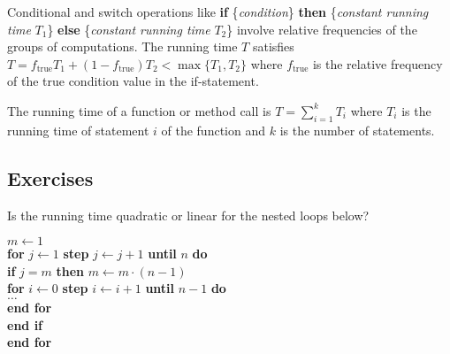 Conditional and switch operations like \textbf{if}
\{\emph{condition}\} \textbf{then} \{\emph{constant running time}
$T_1$\} \textbf{else} \{\emph{constant running time} $T_2$\} involve
relative frequencies of the groups of computations.  The running time
$T$ satisfies $T = f_\mathrm{true} T_1 + (1 - f_\mathrm{true}) T_2 <
\max \{ T_1, T_2 \}$ where $f_\mathrm{true}$ is the relative frequency
of the true condition value in the if-statement.

The running time of a function or method call is $T = \sum_{i=1}^{k}T_i$
where $T_i$ is the running time of statement \(i\) of the function
and $k$ is the number of statements.


\subsection*{Exercises}

\begin{Exercise}
\label{exm:nest1}
Is the running time quadratic or linear for the nested loops below?\\

\begin{minipage}{5in}
\Algorbody
{
\(m \leftarrow 1\) \\
\textbf{for} \(j \leftarrow 1\) \textbf{step} \(j \leftarrow j+1\) 
                                    \textbf{until} \(n\) \textbf{do}\\
\>\textbf{if} \(j = m \) \textbf{then} \(m \leftarrow m \cdot (n-1)\) \\
\>\>\textbf{for} \(i \leftarrow  0\) \textbf{step} \(i \leftarrow i+1\) 
                                       \textbf{until} \(n-1\) \textbf{do}\\
\>\>\>$\ldots$  \\
\>\>\textbf{end for} \\
\>\textbf{end if}\\
\textbf{end for} \\
}
\end{minipage}

\end{Exercise}

